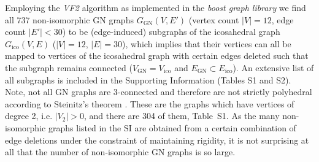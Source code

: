 Employing the \textit{VF2} algorithm \autocite{Cordella_SubGraphIsomorphism_2004}
as implemented in the \textit{boost graph library} \autocite{_boost_2002} we find
all 737 non-isomorphic GN graphs $G_\mathrm{GN}(V,E')$ (vertex count $|V|=12$,
edge count $|E'|<30$) to be (edge-induced) subgraphs of the icosahedral graph
$G_\mathrm{ico}(V,E)$ ($|V|=12$, $|E|=30$), which implies that their vertices can
all be mapped to vertices of the icosahedral graph with certain edges deleted
such that the subgraph remains connected ($V_\mathrm{GN} = V_\mathrm{ico}$ and
$E_\mathrm{GN}\subset E_\mathrm{ico}$). An extensive list of all subgraphs is
included in the Supporting Information (Tables S1 and S2). Note, not all GN
graphs are 3-connected and therefore are not strictly polyhedral according to
Steinitz's theorem \autocite{Steinitz_PolyederundRaumeinteilungen_1916}. These are the graphs which have
vertices of degree 2, i.e. $|V_2|>0$, and there are 304 of them, Table~S1. As
the many non-isomorphic graphs listed in the SI are obtained from a certain
combination of edge deletions under the constraint of maintaining rigidity, it
is not surprising at all that the number of non-isomorphic GN graphs is so
large.

